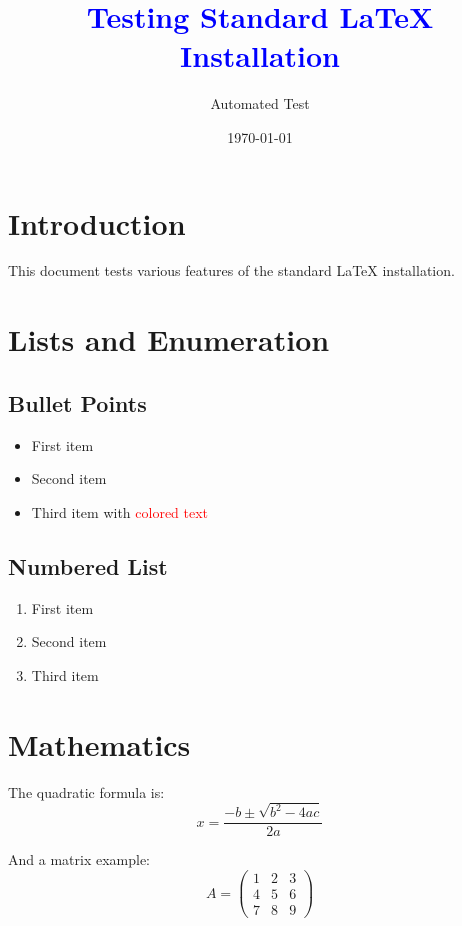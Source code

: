\documentclass[12pt,a4paper]{article}
\title{\textcolor{blue}{Testing Standard \LaTeX{} Installation}}
\author{Automated Test}
\date{\today}
\begin{document}
    \maketitle

    \section{Introduction}
    This document tests various features of the standard \LaTeX{} installation.

    \section{Lists and Enumeration}
    \subsection{Bullet Points}
    \begin{itemize}
        \item First item
        \item Second item
        \item Third item with \textcolor{red}{colored text}
    \end{itemize}

    \subsection{Numbered List}
    \begin{enumerate}[label=\Alph*.]
        \item First item
        \item Second item
        \item Third item
    \end{enumerate}

    \section{Mathematics}
    The quadratic formula is:
    \begin{equation}
        x = \frac{-b \pm \sqrt{b^2 - 4ac}}{2a}
    \end{equation}

    And a matrix example:
    \begin{equation}
        A = \begin{pmatrix}
                1 & 2 & 3 \\
                4 & 5 & 6 \\
                7 & 8 & 9
        \end{pmatrix}
    \end{equation}
\end{document}
